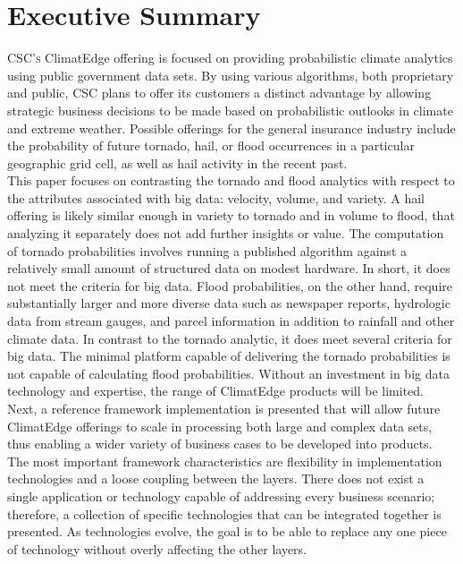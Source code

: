 \section{Executive Summary}
\textsc{CSC's} ClimatEdge\texttrademark{} offering is focused on providing probabilistic climate analytics using public government data sets. By using various algorithms, both proprietary and public, \textsc{CSC} plans to offer its customers a distinct advantage by allowing strategic business decisions to be made based on probabilistic outlooks in climate and extreme weather. Possible offerings for the general insurance industry include the probability of future tornado, hail, or flood occurrences in a particular geographic grid cell, as well as hail activity in the recent past.\\

This paper focuses on contrasting the tornado and flood analytics with respect to the attributes associated with big data: velocity, volume, and variety. A hail offering is likely similar enough in variety to tornado and in volume to flood, that analyzing it separately does not add further insights or value. The computation of tornado probabilities involves running a published algorithm against a relatively small amount of structured data on modest hardware. In short, it does not meet the criteria for big data. Flood probabilities, on the other hand, require substantially larger and more diverse data such as newspaper reports, hydrologic data from stream gauges, and parcel information in addition to rainfall and other climate data. In contrast to the tornado analytic, it does meet several criteria for big data. The minimal platform capable of delivering the tornado probabilities is not capable of calculating flood probabilities. Without an investment in big data technology and expertise, the range of ClimatEdge products will be limited.\\

Next, a reference framework implementation is presented that will allow future ClimatEdge offerings to scale in processing both large and complex data sets, thus enabling a wider variety of business cases to be developed into products. The most important framework characteristics are flexibility in implementation technologies and a loose coupling between the layers. There does not exist a single application or technology capable of addressing every business scenario; therefore, a collection of specific technologies that can be integrated together is presented. As technologies evolve, the goal is to be able to replace any one piece of technology without overly affecting the other layers.\\

